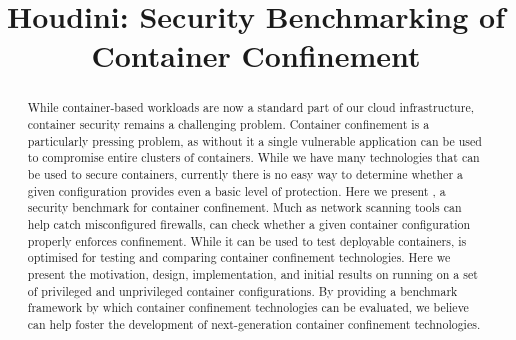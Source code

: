 \documentclass[letterpaper,twocolumn,10pt]{article}
\begin{document}


\title{\Large \bf Houdini: Security Benchmarking of Container Confinement}

\maketitle

\begin{abstract}
  While container-based workloads are now a standard part of our cloud infrastructure, container security remains a challenging problem.  Container confinement is a particularly pressing problem, as without it a single vulnerable application can be used to compromise entire clusters of containers.  While we have many technologies that can be used to secure containers, currently there is no easy way to determine whether a given configuration provides even a basic level of protection.  Here we present \houdini, a security benchmark for container confinement.  Much as network scanning tools can help catch misconfigured firewalls, \houdini can check whether a given container configuration properly enforces confinement.  While it can be used to test deployable containers, \houdini is optimised for testing and comparing container confinement technologies.  Here we present the motivation, design, implementation, and initial results on running \houdini on a set of privileged and unprivileged container configurations.  By providing a benchmark framework by which container confinement technologies can be evaluated, we believe \houdini can help foster the development of next-generation container confinement technologies.
\end{abstract}












\end{document}
